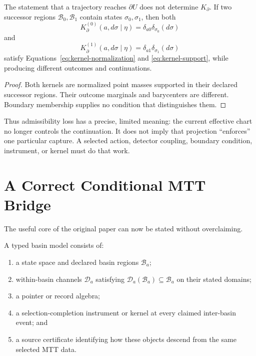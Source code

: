 \documentclass[11pt]{article}
\newcommand{\Bas}{\mathcal B}
\newcommand{\Chan}{\mathcal D}
\begin{document}
\begin{proposition}\label{prop:chart}
The statement that a trajectory reaches $\partial U$ does not determine
$K_\partial$.  If two successor regions $\Bas_0,\Bas_1$ contain states
$\sigma_0,\sigma_1$, then both
\[
 K^{(0)}_\partial(a,d\sigma\mid\eta)
 =\delta_{a0}\delta_{\sigma_0}(d\sigma)
\]
and
\[
 K^{(1)}_\partial(a,d\sigma\mid\eta)
 =\delta_{a1}\delta_{\sigma_1}(d\sigma)
\]
satisfy Equations~\eqref{eq:kernel-normalization} and
\eqref{eq:kernel-support}, while producing different outcomes and
continuations.
\end{proposition}

\begin{proof}
Both kernels are normalized point masses supported in their declared
successor regions.  Their outcome marginals and barycenters are different.
Boundary membership supplies no condition that distinguishes them.
\end{proof}

Thus admissibility loss has a precise, limited meaning: the current effective
chart no longer controls the continuation.  It does not imply that projection
``enforces'' one particular capture.  A selected action, detector coupling,
boundary condition, instrument, or kernel must do that work.

\section{A Correct Conditional MTT Bridge}

The useful core of the original paper can now be stated without overclaiming.

\begin{definition}\label{def:basin}
A typed basin model consists of:
\begin{enumerate}[label=(\roman*)]
\item a state space and declared basin regions $\Bas_a$;
\item within-basin channels $\Chan_a$ satisfying
  $\Chan_a(\Bas_a)\subseteq\Bas_a$ on their stated domains;
\item a pointer or record algebra;
\item a selection-completion instrument or kernel at every claimed
  inter-basin event; and
\item a source certificate identifying how these objects descend from the
  same selected MTT data.
\end{enumerate}
\end{definition}
\end{document}
